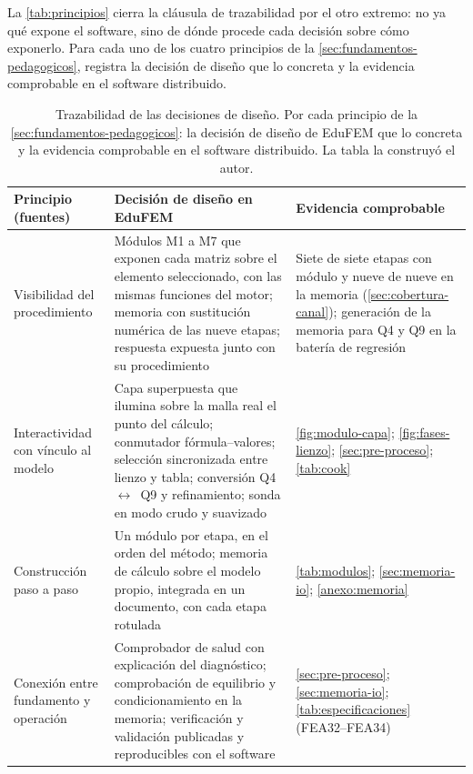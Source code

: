 La \autoref{tab:principios} cierra la cláusula de trazabilidad por el otro extremo: no ya qué expone el software, sino de dónde procede cada decisión sobre cómo exponerlo. Para cada uno de los cuatro principios de la \autoref{sec:fundamentos-pedagogicos}, registra la decisión de diseño que lo concreta y la evidencia comprobable en el software distribuido.

\begin{table}[htbp]
\centering
\caption[Principios, decisiones de diseño y evidencia.]{Trazabilidad de las decisiones de diseño. Por cada principio de la \autoref{sec:fundamentos-pedagogicos}: la decisión de diseño de EduFEM que lo concreta y la evidencia comprobable en el software distribuido. La tabla la construyó el autor.}
\label{tab:principios}
{\footnotesize
\setlength{\tabcolsep}{3pt}
\renewcommand{\arraystretch}{1.12}
\begin{tabular}{@{}>{\raggedright\arraybackslash}p{3.4cm}>{\raggedright\arraybackslash}p{5.6cm}>{\raggedright\arraybackslash}p{5.4cm}@{}}
\toprule
\textbf{Principio (fuentes)} & \textbf{Decisión de diseño en EduFEM} & \textbf{Evidencia comprobable} \\
\midrule
Visibilidad del procedimiento \autocite[p.~157]{lee2015interactive} & Módulos M1 a M7 que exponen cada matriz sobre el elemento seleccionado, con las mismas funciones del motor; memoria con sustitución numérica de las nueve etapas; respuesta expuesta junto con su procedimiento & Siete de siete etapas con módulo y nueve de nueve en la memoria (\autoref{sec:cobertura-canal}); generación de la memoria para Q4 y Q9 en la batería de regresión \\
Interactividad con vínculo al modelo \autocite[pp.~163, 166]{lee2015interactive} & Capa superpuesta que ilumina sobre la malla real el punto del cálculo; conmutador fórmula--valores; selección sincronizada entre lienzo y tabla; conversión Q4~$\leftrightarrow$~Q9 y refinamiento; sonda en modo crudo y suavizado & \autoref{fig:modulo-capa}; \autoref{fig:fases-lienzo}; \autoref{sec:pre-proceso}; \autoref{tab:cook} \\
Construcción paso a paso \autocite[pp.~4-5, 17]{bishay2020teaching} & Un módulo por etapa, en el orden del método; memoria de cálculo sobre el modelo propio, integrada en un documento, con cada etapa rotulada & \autoref{tab:modulos}; \autoref{sec:memoria-io}; \autoref{anexo:memoria} \\
Conexión entre fundamento y operación \autocite[pp.~1159, 1168]{perezsantiago2023fem} & Comprobador de salud con explicación del diagnóstico; comprobación de equilibrio y condicionamiento en la memoria; verificación y validación publicadas y reproducibles con el software & \autoref{sec:pre-proceso}; \autoref{sec:memoria-io}; \autoref{tab:especificaciones} (FEA32--FEA34) \\
\bottomrule
\end{tabular}}
\end{table}

